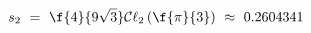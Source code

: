 \begin{equation}\label{cl}
s_{2} ~=~
\f{4}{9\sqrt{3}}\mathcal{C}\ell_{2}\left({\f{\pi}{3}}\right) ~
\approx ~ 0.2604341
\end{equation}

